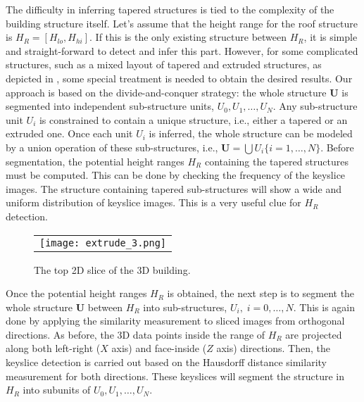 The difficulty in inferring tapered structures is tied to the complexity of
the building structure itself.
Let's assume that the height range for the roof structure is
$H_R = [H_{lo}, H_{hi}]$.
If this is the only existing structure between $H_R$, it is simple and
straight-forward to detect and infer this part.
However, for some complicated structures, such as a mixed layout
of tapered and extruded structures, as depicted in ,
some special treatment is needed to obtain the desired results.
Our approach is based on the divide-and-conquer strategy:
the whole structure $\boldsymbol{U}$ is segmented into independent
sub-structure units, $U_0, U_1, \ldots, U_N$.
Any sub-structure unit $U_i$ is constrained to contain a unique structure,
i.e., either a tapered or an extruded one.
Once each unit $U_i$ is inferred, the whole structure can be modeled by a
union operation of these sub-structures, i.e.,
$\boldsymbol{U} = \bigcup{U_i\{ i = 1,\ldots,N\}}$.
Before segmentation, the potential height ranges $H_R$ containing the tapered
structures must be computed.
This can be done by checking the frequency of the keyslice images.
The structure containing tapered sub-structures will show a wide and uniform
distribution of keyslice images.
This is a very useful clue for $H_R$ detection.

\begin{figure}[htbp]
\begin{center}
\begin{tabular}{c}
\texttt{[image: extrude\_3.png]} \\
\end{tabular}
\end{center}
\caption{The top 2D slice of the 3D building. }
\label{fig:taper_seg}
\end{figure}

Once the potential height ranges $H_R$ is obtained, the next step is to
segment the whole structure $\boldsymbol{U}$ between $H_R$ into sub-structures,
$U_i, \; i = 0,\ldots,N$.
This is again done by applying the similarity measurement to sliced images
from orthogonal directions.
As before, the 3D data points inside the range of $H_R$ are projected
along both left-right ($X$ axis) and face-inside ($Z$ axis) directions.
Then, the keyslice detection is carried out based on the Hausdorff distance
similarity measurement for both directions.
These keyslices will segment the structure in $H_R$ into subunits of
$U_0, U_1, \ldots, U_N$.

